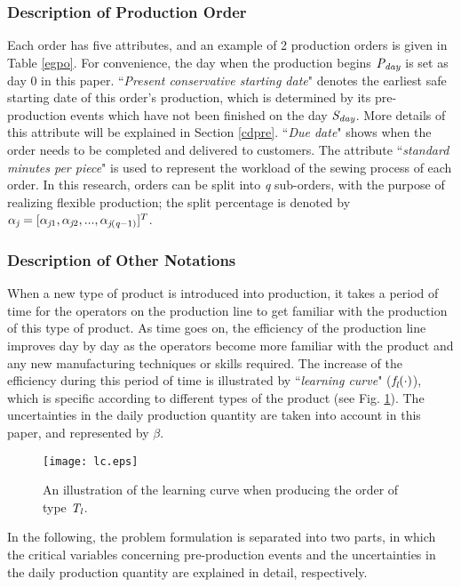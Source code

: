 \documentclass[journal]{IEEEtran}
\theoremstyle{definition}
\begin{document}
\subsubsection{Description of Production Order}
Each order has five attributes, and an example of 2 production orders is given in Table \ref{egpo}. For convenience, the day when the production begins $\emph{P}_\emph{day}$ is set as day 0 in this paper. ``\emph{Present conservative starting date}" denotes the earliest safe starting date of this order's production, which is determined by its pre-production events which have not been finished on the day $\emph{S}_\emph{day}$. More details of this attribute will be explained in Section \ref{cdpre}. ``\emph{Due date}" shows when the order needs to be completed and delivered to customers. The attribute ``\emph{standard minutes per piece}" is used to represent the workload of the sewing process of each order. In this research, orders can be split into \emph{q} sub-orders, with the purpose of realizing flexible production; the split percentage is denoted by $\alpha_\emph{j}=[\alpha_{\emph{j}1}, \alpha_{\emph{j}2},..., \alpha_{\emph{j}(\emph{q}-1)}]^T$.

\subsubsection{Description of Other Notations}
When a new type of product is introduced into production, it takes a period of time for the operators on the production line to get familiar with the production of this type of product. As time goes on, the efficiency of the production line improves day by day as the operators become more familiar with the product and any new manufacturing techniques or skills required. The increase of the efficiency during this period of time is illustrated by ``\emph{learning curve}" ($\emph{f}_\emph{l}(\cdot)$), which is specific according to different types of the product (see Fig. \ref{lcplot}). The uncertainties in the daily production quantity are taken into account in this paper, and represented by $\beta$.
\begin{figure}[!htbp]
\begin{minipage}[t]{1\linewidth}
\centering
\texttt{[image: lc.eps]}
\caption{An illustration of the learning curve when producing the order of type $\emph{T}_\emph{l}$.} \label{lcplot}
\end{minipage}
\end{figure}

In the following, the problem formulation is separated into two parts, in which the critical variables concerning pre-production events and the uncertainties in the daily production quantity are explained in detail, respectively.
\end{document}
